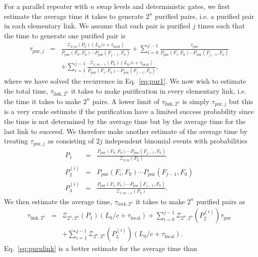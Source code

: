 For a parallel repeater with $n$ swap levels and deterministic gates, we first
estimate the average time it takes to generate $2^{n}$ purified pairs, i.e. a
purified pair in each elementary link. We assume that each pair is purified $j$
times such that the time to generate one purified pair is
\begin{eqnarray} \label{eq:pur2}
\tau_{\text{pur},j}&=&\frac{\mathcal{Z}_{2;m}(P_{0})
(L_{0}/c+\tau_{\text{local}})}{P_{\text{pur}}(F_{0},F_{0}) \cdots
P_{\text{pur}}(F_{j-1},F_{0})}+\sum_{i=0}^{j-1}\frac{\tau_{\text{pur}}}{P_{\text{pur}} (F_{i},F_{0})\cdots
P_{\text{pur}}(F_{j-1},F_{0})} 
\nonumber \\
&&+\sum_{i=1}^{j-1}\frac{\mathcal{Z}_{1;m-1}(P_{0})(L_{0}/c+ \tau_{\text{local}})}{P_{\text{pur}}(F_{i},F_{0})\cdots 
P_{\text{pur}}(F_{j-1},F_{0})},
\end{eqnarray}
where we have solved the recurrence in Eq.~\eqref{eq:pur1}. We now wish to
estimate the total time, $\tau_{\text{link},2^{n}}$ it takes to make
purification in every elementary link, i.e. the time it takes to make $2^{n}$
pairs. A lower limit of $\tau_{\text{link},2^{n}}$ is simply
$\tau_{\text{pur},j}$ but this is a very crude estimate if the purification have
a limited success probability since the time is not determined by the average
time but by the average time for the last link to succeed. We therefore make
another estimate of the average time by treating $\tau_{\text{pur},j}$ as
consisting of $2j$ independent binomial events with probabilities
\begin{eqnarray}
P_{1}&=&\frac{P_{\text{pur}}(F_{0},F_{0})\cdots P_{\text{pur}}
(F_{j-1},F_{0})}{\mathcal{Z}_{2;m}(P_{0})} \\
P_{2}^{(i)}&=&P_{\text{pur}}(F_{i},F_{0})\cdots P_{\text{pur}} (F_{j-1},F_{0})
\\
P_{3}^{(i)}&=&\frac{P_{\text{pur}}(F_{i},F_{0})\cdots P_{\text{pur}}
(F_{j-1},F_{0})}{\mathcal{Z}_{1;m-1}(P_{0})}.
\end{eqnarray}
We then estimate the average time, $\tau_{link,2^{n}}$ it takes to make $2^{n}$
purified pairs as
\begin{eqnarray} \label{eq:purnlink}
\tau_{\text{link},2^{n}}&=&\mathcal{Z}_{2^{n};2^{n}}(P_{1})
(L_{0}/c+\tau_{\text{local}}) 
 +\sum_{i=0}^{j-1}\mathcal{Z}_{2^{n},2^{n}}(P_{2}^{(i)}) \tau_{\text{pur}}
\nonumber \\
&&+\sum_{i=1}^{j-1}\mathcal{Z}_{2^{n},2^{n}}(P_{3}^{(i)})
(L_{0}/c+\tau_{\text{local}}).
\end{eqnarray}
Eq.~\eqref{eq:purnlink} is a better estimate for the average time than
